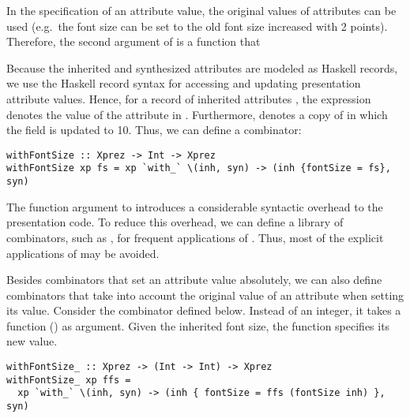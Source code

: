 \bc \toHere
In the specification of an attribute value, the original values of attributes can be used (e.g.\ the font size can be set to the old font size increased with 2 points). Therefore, the second argument of  is a function that %
\fromHere \ec

Because the inherited and synthesized attributes are modeled as Haskell records, we use the Haskell record syntax for  accessing and updating presentation attribute values. Hence, for a record of inherited attributes , the expression  denotes the value of the  attribute in . Furthermore,  denotes a copy of  in which the  field is updated to 10. Thus, we can define a   combinator: 

\begin{small}
\begin{verbatim}
withFontSize :: Xprez -> Int -> Xprez
withFontSize xp fs = xp `with_` \(inh, syn) -> (inh {fontSize = fs}, syn)
\end{verbatim}
\end{small}

The function argument to  introduces a considerable syntactic overhead to the presentation code. To reduce this overhead, we can define a library of combinators, such as , for frequent applications of  . Thus, most of the explicit applications of  may be avoided.

Besides combinators that set an attribute value absolutely, we can also define combinators that take into account the original value of an attribute when setting its value. Consider the combinator  defined below. Instead of an integer, it takes a function () as argument. Given the inherited font size, the function  specifies its new value.

\begin{small}
\begin{verbatim}
withFontSize_ :: Xprez -> (Int -> Int) -> Xprez
withFontSize_ xp ffs = 
  xp `with_` \(inh, syn) -> (inh { fontSize = ffs (fontSize inh) }, syn)
\end{verbatim}
\end{small}

